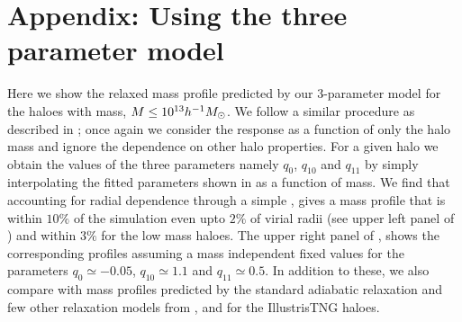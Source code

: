 \section{Appendix: Using the three parameter model}
\label{sec:apndx-demo-ch:z0main}
Here we show the relaxed mass profile predicted by our 3-parameter model  for the haloes with mass, $M\leq10^{13}h^{-1}M_{\odot}$. We follow a similar procedure as described in ; once again we consider the response as a function of only the halo mass and ignore the dependence on other halo properties. For a given halo we obtain the values of the three parameters namely $q_0$, $q_{10}$ and $q_{11}$ by simply interpolating the fitted parameters shown in  as a function of mass. We find that accounting for radial dependence through a simple , gives a mass profile that is within $10\%$ of the simulation even upto $2 \%$ of virial radii (see upper left panel of ) and within $3 \%$ for the low mass haloes. The upper right panel of , shows the corresponding profiles assuming a mass independent fixed values for the parameters $q_0\simeq-0.05$, $q_{10}\simeq1.1$ and $q_{11}\simeq0.5$. In addition to these, we also compare with mass profiles predicted by the standard adiabatic relaxation \citealp{1986ApJ...301...27B} and few other relaxation models from \citet{2004ApJ...616...16G}, \citet{2021MNRAS.507..632P} and \citet{2020MNRAS.494.4291C} for the IllustrisTNG haloes.

